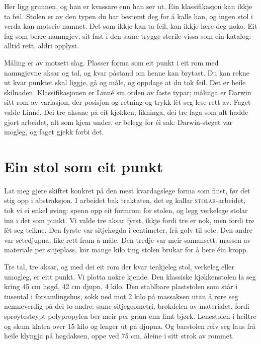 Her ligg grunnen, og han er kvassare enn han ser ut. Ein klassifikasjon kan ikkje ta feil. Stolen er av den typen du har bestemt deg for å kalle han, og ingen stol i verda kan motseie namnet. Det som ikkje kan ta feil, kan ikkje lære deg noko. Eit fag som berre namngjev, sit fast i den same trygge sterile vissa som ein katalog: alltid rett, aldri opplyst.

Måling er av motsett slag. Plasser forma som eit punkt i eit rom med namngjevne aksar og tal, og kvar påstand om henne kan brytast. Du kan rekne ut kvar punktet skal liggje, gå og måle, og oppdage at du tok feil. Det er heile skilnaden. Klassifikasjonen er Linné sin orden av faste typar; målinga er Darwin sitt rom av variasjon, der posisjon og retning og trykk lèt seg lese rett av. Faget valde Linné. Dei tre aksane på eit kjøkken, likninga, dei tre faga som alt hadde gjort arbeidet, alt som kjem under, er belegg for éi sak: Darwin-steget var mogleg, og faget gjekk forbi det.

\section{Ein stol som eit punkt}

Lat meg gjere skiftet konkret på den mest kvardagslege forma som finst, før det stig opp i abstraksjon. I arbeidet bak traktaten, det eg kallar \textsc{stolar}-arbeidet, tok vi ei enkel øving: spenn opp eit formrom for stolen, og legg verkelege stolar inn i det som punkt. Vi valde tre aksar fyrst, ikkje fordi tre er nok, men fordi tre lèt seg teikne. Den fyrste var sitjehøgda i centimeter, frå golv til sete. Den andre var setedjupna, like rett fram å måle. Den tredje var meir samansett: massen av materiale per sitjeplass, kor mange kilo ting stolen brukar for å bere éin kropp.

Tre tal, tre aksar, og med dei eit rom der kvar tenkjeleg stol, verkeleg eller umogleg, er eitt punkt. Vi plotta nokre kjende. Den klassiske kjøkkenstolen la seg kring 45 cm høgd, 42 cm djupn, 4 kilo. Den stablbare plaststolen som står i tusental i forsamlingshus, sokk ned mot 2 kilo på massaksen utan å røre seg nemneverdig på dei to andre: same sitjegeometri, brøkdelen av materialet, fordi sprøytestøypt polypropylen ber meir per gram enn limt bjørk. Lenestolen i heiltre og skum klatra over 15 kilo og lenger ut på djupna. Og barstolen reiv seg laus frå heile klyngja på høgdaksen, oppe ved 75 cm, åleine i sitt strok av rommet.

